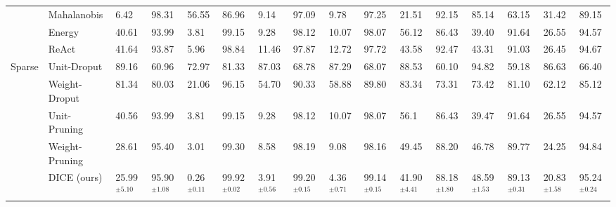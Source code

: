 \documentclass[runningheads]{llncs}
\begin{document}
\begin{sidewaystable}
{\begin{tabular}{llllllllllllllll}
 & Mahalanobis  & 6.42 & 98.31 & 56.55 & 86.96 & 9.14 & 97.09 & 9.78 & 97.25 & 21.51 & 92.15 & 85.14 & 63.15 & 31.42 & 89.15 \\
 & Energy  & 40.61 & 93.99 & 3.81 & 99.15 & 9.28 & 98.12 & 10.07 & 98.07 & 56.12 & 86.43 & 39.40 & 91.64 & 26.55 & 94.57 \\ 
 & ReAct  & 41.64 & 93.87 & 5.96 & 98.84 & 11.46 & 97.87 & 12.72 & 97.72 & 43.58 & 92.47 & 43.31 & 91.03 & 26.45 & 94.67 \\
  \midrule
\multirow{5}{*}{Sparse} & Unit-Droput  & 89.16 & 60.96 & 72.97 & 81.33 & 87.03 & 68.78 & 87.29 & 68.07 & 88.53 & 60.10 & 94.82 & 59.18 & 86.63 & 66.40 \\
 & Weight-Droput & 81.34 & 80.03 & 21.06 & 96.15 & 54.70 & 90.33 & 58.88 & 89.80 & 83.34 & 73.31 & 73.42 & 81.10 & 62.12 & 85.12 \\
 & Unit-Pruning & 40.56 & 93.99 & 3.81 & 99.15 & 9.28 & 98.12 & 10.07 & 98.07 & 56.1 & 86.43 & 39.47 & 91.64 & 26.55 & 94.57  \\
 & Weight-Pruning & 28.61 & 95.40 & 3.01 & 99.30 & 8.58 & 98.19 & 9.08 & 98.16 & 49.45 & 88.20 & 46.78 & 89.77 & 24.25 & 94.84 \\
 & {DICE} (ours) 
 & 25.99$^{\pm{5.10}}$ & 95.90$^{\pm{1.08}}$ & 0.26$^{\pm{0.11}}$ & 99.92$^{\pm{0.02}}$ & 3.91$^{\pm{0.56}}$ & 99.20$^{\pm{0.15}}$ & 4.36$^{\pm{0.71}}$ & 99.14$^{\pm{0.15}}$ & 41.90$^{\pm{4.41}}$ & 88.18$^{\pm{1.80}}$ & 48.59$^{\pm{1.53}}$ & 89.13$^{\pm{0.31}}$ & 20.83$^{\pm{1.58}}$ & 95.24$^{\pm{0.24}}$ 
\\ \bottomrule
\end{tabular}}

\label{tab:detail-results-cifar10}
\end{sidewaystable}
\end{document}
